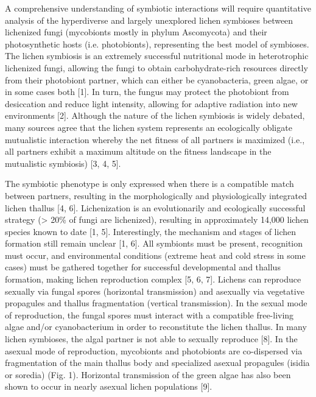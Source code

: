 
A comprehensive understanding of symbiotic interactions will require quantitative analysis of the hyperdiverse and largely unexplored lichen symbioses between lichenized fungi (mycobionts mostly in phylum Ascomycota) and their photosynthetic hosts (i.e. photobionts), representing the best model of symbioses. The lichen symbiosis is an extremely successful nutritional mode in heterotrophic lichenized fungi, allowing the fungi to obtain carbohydrate-rich resources directly from their photobiont partner, which can either be cyanobacteria, green algae, or in some cases both [1]. In turn, the fungus may protect the photobiont from desiccation and reduce light intensity, allowing for adaptive radiation into new environments [2]. Although the nature of the lichen symbiosis is widely debated, many sources agree that the lichen system represents an ecologically obligate mutualistic interaction whereby the net fitness of all partners is maximized (i.e., all partners exhibit a maximum altitude on the fitness landscape in the mutualistic symbiosis) [3, 4, 5]. 

The symbiotic phenotype is only expressed when there is a compatible match between partners, resulting in the morphologically and physiologically integrated lichen thallus [4, 6]. Lichenization is an evolutionarily and ecologically successful strategy (> 20\% of fungi are lichenized), resulting in approximately 14,000  lichen species known to date [1, 5]. Interestingly, the mechanism and stages of lichen formation still remain unclear [1, 6]. All symbionts must be present, recognition must occur, and environmental conditions (extreme heat and cold stress in some cases) must be gathered together for successful developmental and thallus formation, making lichen reproduction complex [5, 6, 7]. Lichens can reproduce sexually via fungal spores (horizontal transmission) and asexually via vegetative propagules and thallus fragmentation (vertical transmission). In the sexual mode of reproduction, the fungal spores must interact with a compatible free-living algae and/or cyanobacterium in order to reconstitute the lichen thallus. In many lichen symbioses, the algal partner is not able to sexually reproduce [8]. In the asexual mode of reproduction, mycobionts and photobionts are co-dispersed via fragmentation of the main thallus body and specialized asexual propagules (isidia or soredia) (Fig. 1). Horizontal transmission of the green algae has also been shown to occur in nearly asexual lichen populations [9]. 


